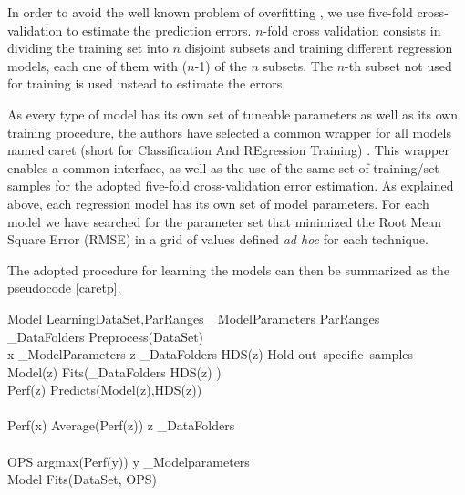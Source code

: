 In order to avoid the well known problem of overfitting \cite[see
e.g.][]{Dietterich:1995:OUM:212094.212114}, we use five-fold
cross-validation to estimate the prediction errors. $n$-fold cross
validation consists in dividing the training set into $n$ disjoint
subsets and training different regression models, each one of them
with ($n$-1) of the $n$ subsets. The $n$-th subset not used for
training is used instead to estimate the errors.

As every type of model has its own set of tuneable parameters as well
as its own training procedure, the authors have selected a common
\citep{R2016} wrapper for all models named caret (short for
Classification And REgression Training) \citep{caret}.  This wrapper
enables a common interface, as well as the use of the same set of
training/set samples for the adopted five-fold cross-validation error
estimation. As explained above, each regression model has its own set
of model parameters. For each model we have searched for the parameter
set that minimized the Root Mean Square Error (RMSE) in a grid of
values defined {\it ad hoc} for each technique.

The adopted procedure for learning the models can then be summarized
as the pseudocode \ref{caretp}.

\begin{pseudocode}[plain]{Model Learning}{DataSet,ParRanges}
\label{caretp}
 _{ModelParameters} \GETS ParRanges \\
 _{DataFolders} \GETS Preprocess(DataSet) \\ 
 \FOREACH x \in {}_{ModelParameters} \DO
  \BEGIN
    \FOREACH z \in {}_{DataFolders} \DO
      \BEGIN
	HDS(z) \GETS \mbox{Hold-out specific samples} \\
	Model(z) \GETS Fits(_{DataFolders} \setminus HDS(z) ) \\
	Perf(z) \GETS Predicts(Model(z),HDS(z)) \\
      \END \\
    Perf(x) \GETS Average(Perf(z)) \quad \forall z \in {}_{DataFolders} \\
  \END \\
  
  OPS \GETS argmax(Perf(y)) \quad \forall y \in {}_{Modelparameters} \\
  Model \GETS Fits(DataSet, OPS) \\
\end{pseudocode}

